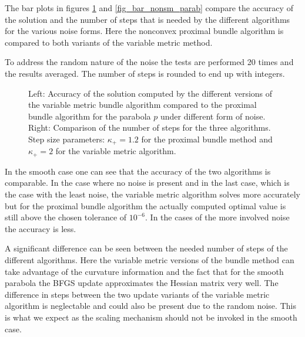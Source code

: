 The bar plots in figures \ref{fig_bar_parab} and \ref{fig_bar_nonsm_parab} compare the accuracy of the solution and the number of steps that is needed by the different algorithms for the various noise forms. Here the nonconvex proximal bundle algorithm is compared to both variants of the variable metric method.

To address the random nature of the noise the tests are performed 20 times and the results averaged. The number of steps is rounded to end up with integers.

\begin{figure}[ht]
	\begin{subfigure}[t]{0.49\textwidth}
	\end{subfigure}
	\begin{subfigure}[t]{0.49\textwidth}
	\end{subfigure}
	\caption{Left: Accuracy of the solution computed by the different versions of the variable metric bundle algorithm compared to the proximal bundle algorithm for the parabola \(p\) under different form of noise.\\
	Right: Comparison of the number of steps for the three algorithms.\\
	Step size parameters: \(\kappa_+ = 1.2\) for the proximal bundle method and \(\kappa_+ = 2\) for the variable metric algorithm. }
	\label{fig_bar_parab}
\end{figure}

In the smooth case one can see that the accuracy of the two algorithms is comparable. In the case where no noise is present and in the last case, which is the case with the least noise, the variable metric algorithm solves more accurately but for the proximal bundle algorithm the actually computed optimal value is still above the chosen tolerance of \(10^{-6}\).
In the cases of the more involved noise the accuracy is less.

A significant difference can be seen between the needed number of steps of the different algorithms. Here the variable metric versions of the bundle method can take advantage of the curvature information and the fact that for the smooth parabola the BFGS update approximates the Hessian matrix very well.
The difference in steps between the two update variants of the variable metric algorithm is neglectable and could also be present due to the random noise. This is what we expect as the scaling mechanism should not be invoked in the smooth case.

